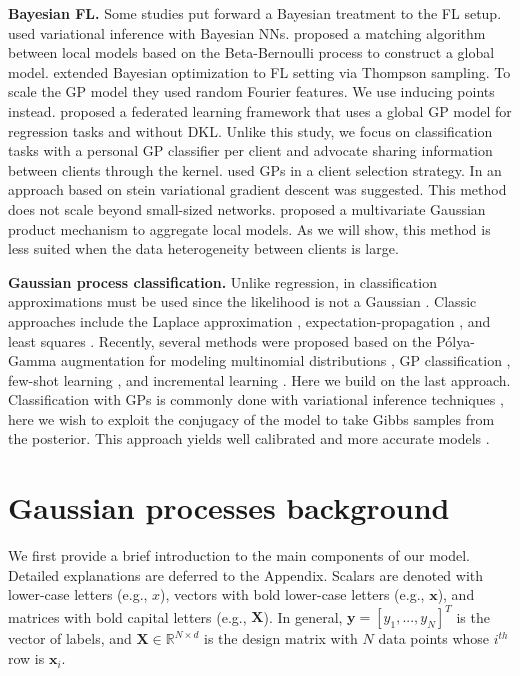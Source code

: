 \documentclass{article}
\def\rvx{{\mathbf{x}}}
\def\rvy{{\mathbf{y}}}
\def\rmX{{\mathbf{X}}}
\def\sR{{\mathbb{R}}}
\newcommand{\pg}{P\'olya-Gamma }
\begin{document}
\textbf{Bayesian FL.}
Some studies put forward a Bayesian treatment to the FL setup. \cite{bui2018partitioned, corinzia2019variational} used variational inference with Bayesian NNs. \cite{wang2019federated, yurochkin2019bayesian} proposed a matching algorithm between local models based on the Beta-Bernoulli process to construct a global model. \cite{dai2020federated} extended Bayesian optimization to FL setting via Thompson sampling. To scale the GP model they used random Fourier features. We use inducing points instead.
\cite{yin2020fedloc} proposed a federated learning framework that uses a global GP model for regression tasks and without DKL. Unlike this study, we focus on classification tasks with a personal GP classifier per client and advocate sharing information between clients through the kernel. \cite{tang2021fedgp} used GPs in a client selection strategy. In \cite{kassab2020federated} an approach based on stein variational gradient descent was suggested. This method does not scale beyond small-sized networks. \cite{liu2021bayesian} proposed a multivariate Gaussian product mechanism to aggregate local models. As we will show, this method is less suited when the data heterogeneity between clients is large.

\textbf{Gaussian process classification.} 
Unlike regression, in classification approximations must be used since the likelihood is not a Gaussian \cite{gp_book}. Classic approaches include the Laplace approximation \cite{williams1998bayesian}, expectation-propagation \cite{minka2001family}, and least squares \cite{rifkin2004defense}. Recently, several methods were proposed based on the \pg augmentation \cite{polya_gamma} for modeling multinomial distributions \cite{linderman2015dependent}, GP classification \cite{ galy2020multi, galy2020automated, WenzelGDKO19}, few-shot learning \cite{snell2020bayesian}, and incremental learning \cite{achituve2021gp_icml}. Here we build on the last approach. Classification with GPs is commonly done with variational inference techniques \cite{hensman2015scalable}, here we wish to exploit the conjugacy of the model to take Gibbs samples from the posterior. This approach yields well calibrated \cite{snell2020bayesian} and more accurate models \cite{achituve2021gp_icml}.


\section{Gaussian processes background} \label{sec:background}

We first provide a brief introduction to the main components of our model. Detailed explanations are deferred to the Appendix. Scalars are denoted with lower-case letters (e.g., $x$), vectors with bold lower-case letters (e.g., $\rvx$), and matrices with bold capital letters (e.g., $\rmX$). In general, $\rvy=[y_1,...,y_N]^T$ is the vector of labels, and $\rmX \in \sR^{N\times d}$ is the design matrix with $N$ data points whose $i^{th}$ row is $\rvx_i$.
\end{document}
